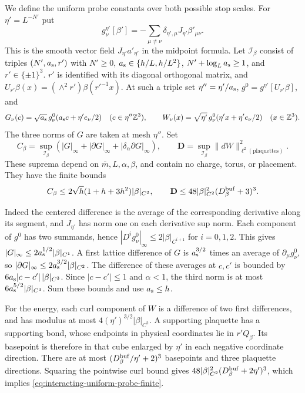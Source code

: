 We define the uniform probe constants over both
possible stop scales. For $\eta'=L^{-N'}$ put
\[
 g_\nu^{\eta'}[\beta']
      =-\sum_{\mu\ne\nu}\delta_{\eta',\mu}J_{\eta'}\beta'_{\mu\nu}.
\]
This is the smooth vector field
$J_{\eta'}a'_{\eta'}$ in the midpoint formula.
Let $\mathcal I_\beta$ consist of triples
$(N',a_{\rm s},r')$ with
$N'\ge0$, $a_{\rm s}\in\{h/L,h/L^2\}$,
$N'+\log_La_{\rm s}\ge1$, and
$r'\in\{\pm1\}^3$.
$r'$ is identified with its diagonal orthogonal
matrix, and $U_{r'}\beta(x)=(\wedge^2r')\beta(r'^{-1}x)$.
At such a triple set $\eta''=\eta'/a_{\rm s}$,
$g^0=g^{\eta'}[U_{r'}\beta]$, and
\[
 G_\nu(c)=\sqrt{a_{\rm s}}\,
                  g_\nu^0(a_{\rm s}c+\eta'e_\nu/2)
                       \quad(c\in\eta''\mathbb Z^3),\qquad
 W_\nu(x)=\sqrt{\eta'}\,g_\nu^0(\eta'x+\eta'e_\nu/2)
                       \quad(x\in\mathbb Z^3).
\]
The three norms of $G$ are taken at mesh $\eta''$.
Set
\begin{equation}\label{eq:interacting-uniform-probe-constants}
 C_\beta=\sup_{\mathcal I_\beta}
              (|G|_\infty+|\partial G|_\infty+
                                    |\delta_\alpha\partial G|_\infty),
 \qquad
 \mathbf D=\sup_{\mathcal I_\beta}\|dW\|_{\ell^2(\text{plaquettes})}^2.
\end{equation}
These suprema depend on $\bar m,L,\alpha,\beta$,
and contain no charge, torus, or placement.
They have the finite bounds
\begin{equation}\label{eq:interacting-uniform-probe-finite}
 C_\beta\le2\sqrt h(1+h+3h^2)|\beta|_{C^3},
 \qquad
 \mathbf D\le48|\beta|_{C^2}^2(D_\beta^{\rm buf}+3)^3 .
\end{equation}

Indeed the centered difference is the average
of the corresponding derivative along its
segment, and $J_{\eta'}$ has norm one on
each derivative sup norm. Each component
of $g^0$ has two summands, hence
$|D^ig_\nu^0|_\infty\le2|\beta|_{C^{i+1}}$ for
$i=0,1,2$. This gives
$|G|_\infty\le2a_{\rm s}^{1/2}|\beta|_{C^1}$.
A first lattice difference of $G$ is
$a_{\rm s}^{3/2}$ times an average of
$\partial_\mu g_\nu^0$, so
$|\partial G|_\infty\le2a_{\rm s}^{3/2}|\beta|_{C^2}$.
The difference of these averages at $c,c'$
is bounded by
$6a_{\rm s}|c-c'|\,|\beta|_{C^3}$.
Since $|c-c'|\le1$ and $\alpha<1$,
the third norm is at most
$6a_{\rm s}^{5/2}|\beta|_{C^3}$.
Sum these bounds and use $a_{\rm s}\le h$.

For the energy, each curl component of $W$
is a difference of two first differences,
and has modulus at most
$4(\eta')^{3/2}|\beta|_{C^2}$.
A supporting plaquette has a supporting
bond, whose endpoints in physical coordinates
lie in $r'Q_\beta$.
Its basepoint is therefore in that cube
enlarged by $\eta'$ in each negative
coordinate direction. There are at most
$(D_\beta^{\rm buf}/\eta'+2)^3$ basepoints
and three plaquette directions. Squaring
the pointwise curl bound gives
$48|\beta|_{C^2}^2(D_\beta^{\rm buf}+2\eta')^3$,
which implies \eqref{eq:interacting-uniform-probe-finite}.

